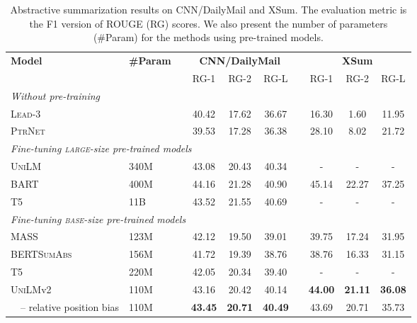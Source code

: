 \documentclass{article}
\newcommand{\bartlarge}{BART}
\newcommand{\vonelarge}{\textsc{UniLM}}
\newcommand{\vtwobase}{\textsc{UniLM}v2}
\newcommand\norelposfull{-- relative position bias}
\begin{document}
\begin{table*}[t]
\centering
\begin{tabular}{lllccclccc}
\toprule
\multirow{2}{*}{\bf Model}                          & \multirow{2}{*}{\bf \#Param} & & \multicolumn{3}{c}{\bf CNN/DailyMail} & & \multicolumn{3}{c}{\bf XSum} \\
&                              & & RG-1  & RG-2  &      RG-L      & & RG-1  & RG-2  &     RG-L     \\ \midrule
\multicolumn{8}{l}{\textit{Without pre-training}} & & \\
\textsc{Lead}-3 &                                                         & & 40.42 & 17.62 &     36.67      & & 16.30 & 1.60  &    11.95     \\
\textsc{PtrNet}~\cite{see-2017-get} &                                      & & 39.53 & 17.28 &     36.38      & & 28.10 & 8.02  &    21.72     \\ \midrule
\multicolumn{8}{l}{\textit{Fine-tuning \textsc{large}-size pre-trained models}} & & \\
\vonelarge{}~\cite{unilm}                                        & 340M                         & & 43.08 & 20.43 &     40.34      & &   -   &   -   &      -       \\
\bartlarge{}~\cite{bart}                                        & 400M                         & & 44.16 & 21.28 &     40.90      & & 45.14 & 22.27 &    37.25     \\
{T5}~\cite{t5}                               & 11B                          & & 43.52 & 21.55 & 40.69 & &   -   &   -   &      -       \\  \midrule
\multicolumn{8}{l}{\textit{Fine-tuning \textsc{base}-size pre-trained models}} & & \\
{MASS}~\cite{mass}                            & 123M                         & & 42.12 & 19.50 &     39.01      & & 39.75 & 17.24 &    31.95     \\
\textsc{BERTSumAbs}~\cite{bertsum}                                 & 156M                         & & 41.72 & 19.39 &     38.76      & & 38.76 & 16.33 &    31.15     \\
{T5}~\cite{t5}                              & 220M                         & &   42.05 & 20.34 & 39.40        & &   -   &   -   &      -       \\
\vtwobase{}                                         & 110M                         & &   {43.16} & {20.42} & {40.14} & & \textbf{44.00} & \textbf{21.11} & \textbf{36.08}     \\
~~\norelposfull{}                                         & 110M                         & &   \textbf{43.45} & \textbf{20.71} & \textbf{40.49} & & 43.69 & 20.71 &    35.73     \\
\bottomrule
\end{tabular}
\caption{
Abstractive summarization results on CNN/DailyMail and XSum.
The evaluation metric is the F1 version of ROUGE (RG) scores.
We also present the number of parameters (\#Param) for the methods using pre-trained models.
}
\label{tbl:summ:base}
\end{table*}
\end{document}
